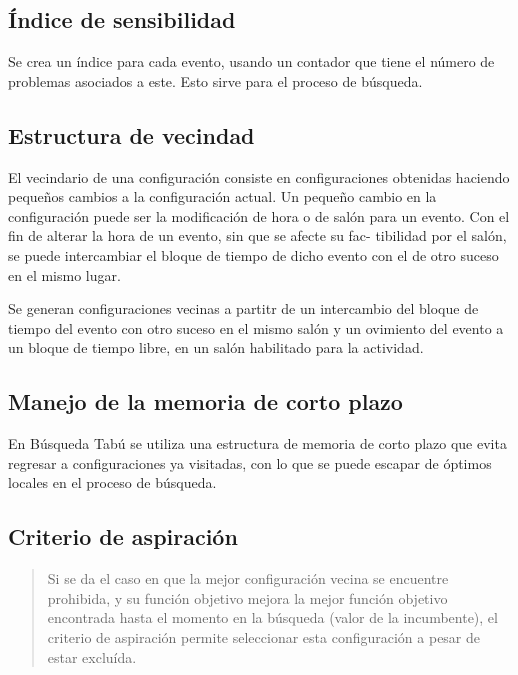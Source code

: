 \documentclass[12pt,letterpaper]{article}
\begin{document}
\subsection{Índice de sensibilidad}
Se crea un índice para cada evento, usando un contador que tiene el número de problemas asociados
a este. Esto sirve para el proceso de búsqueda.

\subsection{Estructura de vecindad}
El vecindario de una configuración consiste en configuraciones obtenidas haciendo pequeños cambios a
la configuración actual. Un pequeño cambio en la configuración puede ser la modificación de hora o de
salón para un evento. Con el fin de alterar la hora de un evento, sin que se afecte su fac- tibilidad
por el salón, se puede intercambiar el bloque de tiempo de dicho evento con el de otro suceso en el mismo lugar.

Se generan configuraciones vecinas a partitr de un intercambio del bloque de tiempo del evento con otro suceso en el
mismo salón y un ovimiento del evento a un bloque de tiempo libre, en un salón habilitado para la actividad.

\subsection{Manejo de la memoria de corto plazo}
En Búsqueda Tabú se utiliza una estructura de memoria de corto plazo que evita regresar a configuraciones
ya visitadas, con lo que se puede escapar de óptimos locales en el proceso de búsqueda.

\subsection{Criterio de aspiración}
\blockquote{
Si se da el caso en que la mejor configuración vecina se encuentre prohibida, y su función objetivo mejora la mejor función
objetivo encontrada hasta el momento en la búsqueda (valor de la incumbente), el criterio de aspiración permite seleccionar
esta configuración a pesar de estar excluída.
}
\end{document}
